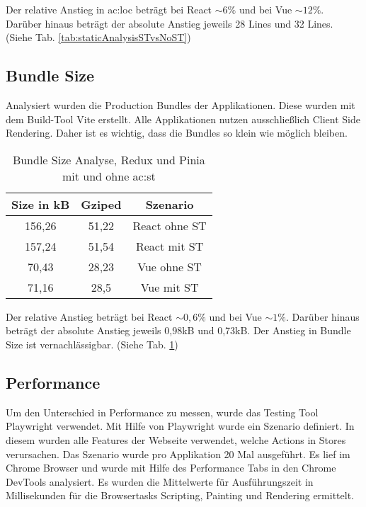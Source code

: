 Der relative Anstieg in \acrshort{ac:loc} beträgt bei React $\sim6\%$ und bei Vue $\sim12\%$. Darüber hinaus beträgt der absolute Anstieg jeweils 28 Lines und 32 Lines. (Siehe Tab. \ref{tab:staticAnalysisSTvsNoST})

\subsection{Bundle Size}

Analysiert wurden die Production Bundles der Applikationen. Diese wurden mit dem Build-Tool Vite erstellt. Alle Applikationen nutzen ausschließlich Client Side Rendering. Daher ist es wichtig, dass die Bundles so klein wie möglich bleiben.

\begin{table}[!ht]
  \caption{Bundle Size Analyse, Redux und Pinia mit und ohne \acrshort{ac:st}}
  \label{tab:bundleSizeAnalysisSTvsNoST}

  \begin{center}
    \begin{tabular}{|c|c|c|} 
    \hline
    Size in kB & Gziped & Szenario \\ [0.5ex]
    \hline\hline
    156,26 & 51,22 & React ohne ST \\
    \hline
    157,24 & 51,54 & React mit ST \\
    \hline
    70,43 & 28,23 & Vue ohne ST \\
    \hline
    71,16 & 28,5 & Vue mit ST \\
    \hline
    \end{tabular}
  \end{center}
\end{table}

Der relative Anstieg beträgt bei React $\sim0,6\%$ und bei Vue $\sim1\%$. Darüber hinaus beträgt der absolute Anstieg jeweils 0,98kB und 0,73kB. Der Anstieg in Bundle Size ist vernachlässigbar. (Siehe Tab. \ref{tab:bundleSizeAnalysisSTvsNoST})

\subsection{Performance}

Um den Unterschied in Performance zu messen, wurde das Testing Tool Playwright verwendet. Mit Hilfe von Playwright wurde ein Szenario definiert. In diesem wurden alle Features der Webseite verwendet, welche Actions in Stores verursachen. Das Szenario wurde pro Applikation 20 Mal ausgeführt. Es lief im Chrome Browser und wurde mit Hilfe des Performance Tabs in den Chrome DevTools analysiert. Es wurden die Mittelwerte für Ausführungszeit in Millisekunden für die Browsertasks Scripting, Painting und Rendering ermittelt.

